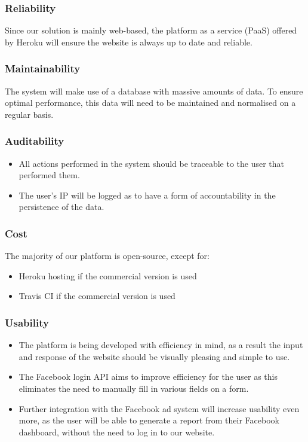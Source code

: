 \documentclass{article}
\begin{document}
		\subsubsection{Reliability}
			Since our solution is mainly web-based, the platform as a service (PaaS) offered by Heroku will ensure the website is always up to date and reliable.

		\subsubsection{Maintainability}
			The system will make use of a database with massive amounts of data. To ensure optimal performance, this data will need to be maintained and normalised on a regular basis.

		\subsubsection{Auditability}
		\begin{itemize}
			\item All actions performed in the system should be traceable to the user that performed them.
			\item The user's IP  will be logged as to have a form of accountability in the persistence of the data.
		\end{itemize}

		\subsubsection{Cost}
			The majority of our platform is open-source, except for:
		\begin{itemize}
			\item Heroku hosting if the commercial version is used
			\item Travis CI if the commercial version is used
		\end{itemize}

		\subsubsection{Usability}
		\begin{itemize}
			\item The platform is being developed with efficiency in mind, as a result the input and response of the website should be visually pleasing and simple to use.
			\item The Facebook login API aims to improve efficiency for the user as this eliminates the need to manually fill in various fields on a form.
			\item Further integration with the Facebook ad system will increase usability even more, as the user will be able to generate a report from their Facebook dashboard, without the need to log in to our website.
		\end{itemize}
\end{document}
